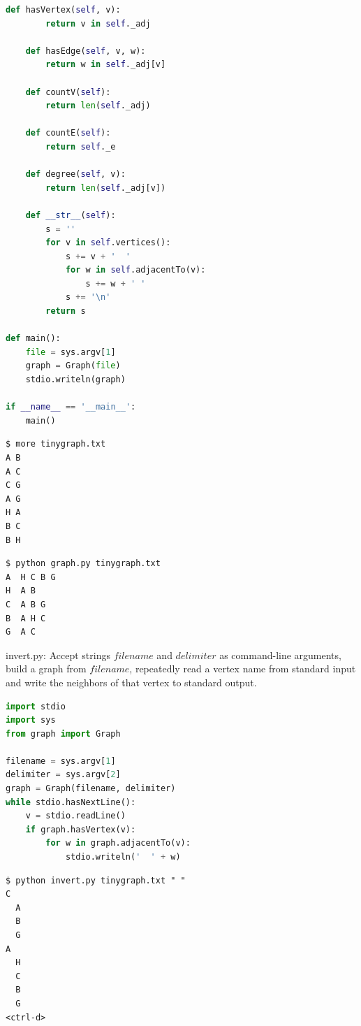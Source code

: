 \documentclass[8pt,a4paper,compress]{beamer}
\begin{document}
\begin{frame}[fragile]
\pause

\begin{lstlisting}[language=Python]
    def hasVertex(self, v):
        return v in self._adj

    def hasEdge(self, v, w):
        return w in self._adj[v]
    
    def countV(self):
        return len(self._adj)
    
    def countE(self):
        return self._e
    
    def degree(self, v):
        return len(self._adj[v])

    def __str__(self):
        s = ''
        for v in self.vertices():
            s += v + '  '
            for w in self.adjacentTo(v):
                s += w + ' '
            s += '\n'
        return s

def main():
    file = sys.argv[1]
    graph = Graph(file)
    stdio.writeln(graph)

if __name__ == '__main__':
    main()
\end{lstlisting}
\end{frame}

\begin{frame}[fragile]
\pause

\begin{lstlisting}[language={}]
$ more tinygraph.txt
A B
A C
C G
A G
H A
B C
B H
\end{lstlisting}

\pause

\begin{lstlisting}[language={}]
$ python graph.py tinygraph.txt 
A  H C B G 
H  A B 
C  A B G 
B  A H C 
G  A C 

\end{lstlisting}
\end{frame}

\begin{frame}[fragile]
\pause

\begin{framed}
\tiny invert.py: Accept strings $filename$ and $delimiter$ as command-line arguments, build a graph from $filename$, repeatedly read a vertex name from standard input and write the neighbors of that vertex to standard output.
\end{framed}

\begin{lstlisting}[language=Python]
import stdio
import sys
from graph import Graph

filename = sys.argv[1]
delimiter = sys.argv[2]
graph = Graph(filename, delimiter)
while stdio.hasNextLine():
    v = stdio.readLine()
    if graph.hasVertex(v):
        for w in graph.adjacentTo(v):
            stdio.writeln('  ' + w)
\end{lstlisting}

\pause

\begin{lstlisting}[language={}]
$ python invert.py tinygraph.txt " "
C
  A
  B
  G
A
  H
  C
  B
  G
<ctrl-d>
\end{lstlisting}
\end{frame}
\end{document}
